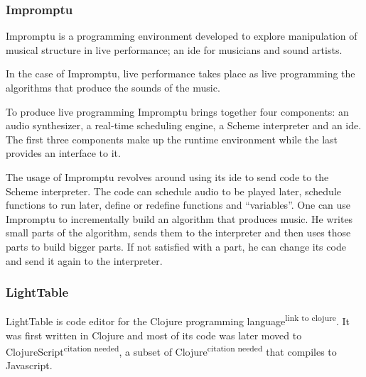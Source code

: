 \documentclass{./llncs2e/llncs}
\begin{document}
\subsubsection{Impromptu\cite{sorensen2005impromptu}\cite{sorensen2010programming}}
Impromptu is a programming environment developed to explore manipulation of musical structure in live performance; an \ac{ide} for musicians and sound artists.

In the case of Impromptu, live performance takes place as live programming the algorithms that produce the sounds of the music.

To produce live programming Impromptu brings together four components: an audio synthesizer, a real-time scheduling engine, a Scheme interpreter and an \ac{ide}. The first three components make up the runtime environment while the last provides an interface to it. 

The usage of Impromptu revolves around using its \ac{ide} to send code to the Scheme interpreter. The code can schedule audio to be played later, schedule functions to run later, define or redefine functions and ``variables''. 
One can use Impromptu to incrementally build an algorithm that produces music. He writes small parts of the algorithm, sends them to the interpreter and then uses those parts to build bigger parts. If not satisfied with a part, he can change its code and send it again to the interpreter.


\subsubsection{LightTable}
LightTable is code editor for the Clojure programming language\textsuperscript{link to clojure}. It was first written in Clojure and most of its code was later moved to ClojureScript\textsuperscript{citation needed}, a subset of Clojure\textsuperscript{citation needed} that compiles to Javascript.
\end{document}
